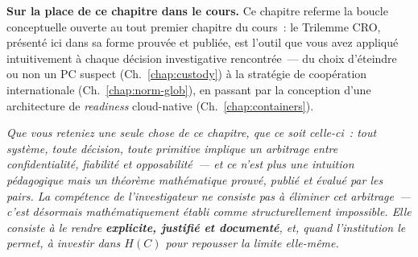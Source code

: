 \begin{boxinfo}
\textbf{Sur la place de ce chapitre dans le cours.} Ce chapitre
referme la boucle conceptuelle ouverte au tout premier chapitre
du cours~: le Trilemme CRO, présenté ici dans sa forme prouvée et
publiée, est l'outil que vous avez appliqué intuitivement à chaque
décision investigative rencontrée~--- du choix d'éteindre ou non
un PC suspect (Ch.~\ref{chap:custody}) à la stratégie de coopération
internationale (Ch.~\ref{chap:norm-glob}), en passant par la
conception d'une architecture de \textit{readiness} cloud-native
(Ch.~\ref{chap:containers}).

\textit{Que vous reteniez une seule chose de ce chapitre, que ce
soit celle-ci~: tout système, toute décision, toute primitive
implique un arbitrage entre confidentialité, fiabilité et
opposabilité~--- et ce n'est plus une intuition pédagogique mais
un théorème mathématique prouvé, publié et évalué par les pairs.
La compétence de l'investigateur ne consiste pas à éliminer cet
arbitrage~--- c'est désormais mathématiquement établi comme
structurellement impossible. Elle consiste à le rendre
\textbf{explicite, justifié et documenté}, et, quand l'institution
le permet, à investir dans $H(C)$ pour repousser la limite elle-même.}
\end{boxinfo}

